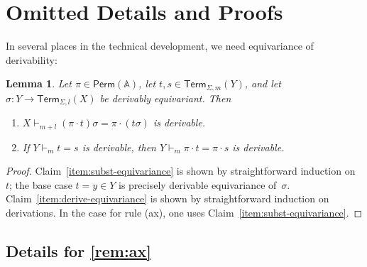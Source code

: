 \documentclass[11pt,a4paper]{amsart}
\newtheorem{lemma}[lemma]{Lemma}
\newif\iffullversion
\newcommand{\Perm}{\mathsf{Perm}(\Names)}
\newcommand{\Term}{\mathsf{Term}}
\newcommand{\Names}{\mathbb{A}}
\theoremstyle{plain}
\numberwithin{equation}{section}
\newcommand{\+}[1]{\mathcal{#1}\xspace}
\theoremstyle{definition}
\begin{document}
\iffullversion

\clearpage
\appendix


\section{Omitted Details and Proofs}

In several places in the technical development, we need equivariance
of derivability:
\begin{lemma}\label{lem:equivariance}
  Let $\pi\in \Perm$, let $t,s\in\Term_{\Sigma,m}(Y)$, and let
  \(\sigma\colon Y \to \Term_{\Sigma, l}(X)\) be derivably
  equivariant. Then
  \begin{enumerate}
  \item\label{item:subst-equivariance}
    $X\vdash_{m+l}(\pi\cdot t)\sigma=\pi\cdot(t\sigma)$ is derivable.

  \item\label{item:derive-equivariance} If $Y\vdash_mt=s$ is
    derivable, then
    \(Y \vdash_m \pi\cdot t = \pi\cdot s\) is
    derivable.
  \end{enumerate}
\end{lemma}


\begin{proof}
  Claim~\ref{item:subst-equivariance} is shown by straightforward
  induction on~$t$; the base case $t=y\in Y$ is precisely derivable
  equivariance of~$\sigma$.  Claim~\ref{item:derive-equivariance} is
  shown by straightforward induction on derivations. In the case for
  rule (ax), one uses Claim~\ref{item:subst-equivariance}.
\end{proof}
\subsection*{Details for  \cref{rem:ax}}
\end{document}
